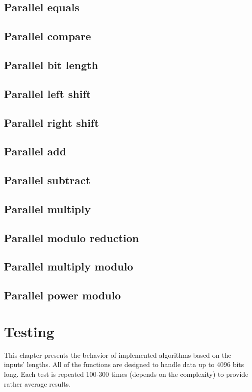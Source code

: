 \documentclass[oneside,openright,12pt,final,en]{mgr}
\begin{document}
\section{Parallel equals}
\section{Parallel compare}
\section{Parallel bit length}
\section{Parallel left shift}
\section{Parallel right shift}
\section{Parallel add}
\section{Parallel subtract}
\section{Parallel multiply}
\section{Parallel modulo reduction}
\section{Parallel multiply modulo}
\section{Parallel power modulo}

\chapter{Testing}
This chapter presents the behavior of implemented algorithms based on the inputs' lengths. All of the functions are designed to handle data up to 4096 bits long. Each test is repeated 100-300 times (depends on the complexity) to provide rather average results.  
\end{document}
